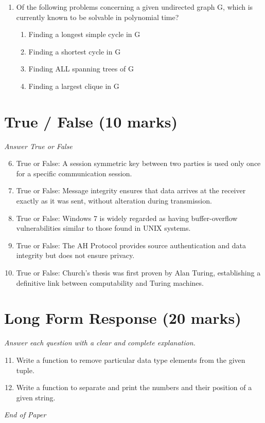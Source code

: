 \documentclass[12pt]{article}
\begin{document}
\begin{enumerate}[label=\arabic*.]
\begin{enumerate}[label=(\alph*)]
    \item Dynamically linked libraries
    \item Global variables
\end{enumerate}
\item Of the following problems concerning a given undirected graph G, which is currently known to be solvable in polynomial time?
\begin{enumerate}[label=(\alph*)]
    \item Finding a longest simple cycle in G
    \item Finding a shortest cycle in G
    \item Finding ALL spanning trees of G
    \item Finding a largest clique in G
\end{enumerate}
\end{enumerate}

\section*{True / False (10 marks)}
\textit{Answer True or False}
\begin{enumerate}[label=\arabic*.]
\setcounter{enumi}{5}
\item True or False: A session symmetric key between two parties is used only once for a specific communication session.
\item True or False: Message integrity ensures that data arrives at the receiver exactly as it was sent, without alteration during transmission.
\item True or False: Windows 7 is widely regarded as having buffer-overflow vulnerabilities similar to those found in UNIX systems.
\item True or False: The AH Protocol provides source authentication and data integrity but does not ensure privacy.
\item True or False: Church's thesis was first proven by Alan Turing, establishing a definitive link between computability and Turing machines.
\end{enumerate}

\section*{Long Form Response (20 marks)}
\textit{Answer each question with a clear and complete explanation.}
\begin{enumerate}[label=\arabic*.]
\setcounter{enumi}{10}
\item Write a function to remove particular data type elements from the given tuple.
\item Write a function to separate and print the numbers and their position of a given string.
\end{enumerate}

\vfill
\noindent\textit{End of Paper}
\end{document}
